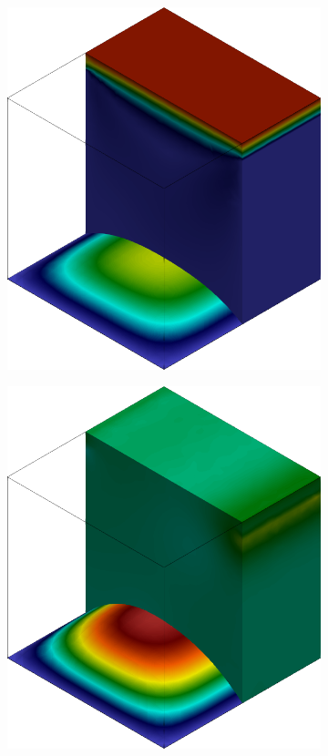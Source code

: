 \begin{figure}[h!]
\begin{subfigure}[b]{0.23\textwidth}
    \end{subfigure}
    \begin{subfigure}[b]{0.23\textwidth}
        \includegraphics[width=\linewidth]{Figuras/FSI-Cavity3D/u21-8.png}
    \end{subfigure}
    \caption*{$t=21,8$}
    \begin{subfigure}[b]{0.23\textwidth}
        \includegraphics[width=\linewidth]{Figuras/FSI-Cavity3D/p24-3.png}

\end{subfigure}
\end{figure}
